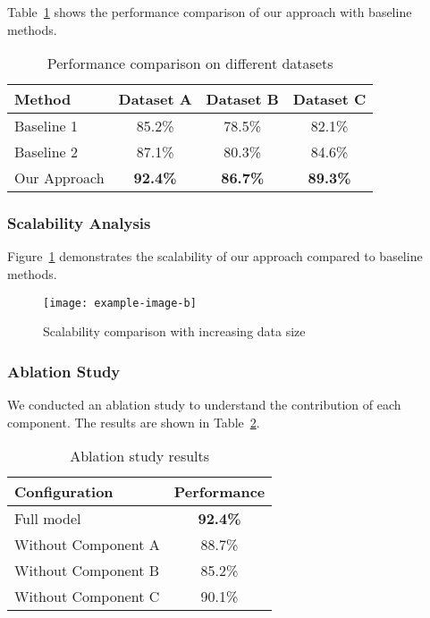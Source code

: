 Table~\ref{tab:paperone-performance} shows the performance comparison of our approach with baseline methods.

\begin{table}[!htb]
\centering
\caption{Performance comparison on different datasets}
\label{tab:paperone-performance}
\begin{tabular}{@{}lccc@{}}
\toprule
Method & Dataset A & Dataset B & Dataset C \\
\midrule
Baseline 1 & 85.2\% & 78.5\% & 82.1\% \\
Baseline 2 & 87.1\% & 80.3\% & 84.6\% \\
Our Approach & \textbf{92.4\%} & \textbf{86.7\%} & \textbf{89.3\%} \\
\bottomrule
\end{tabular}
\end{table}

\subsubsection{Scalability Analysis}

Figure~\ref{fig:paperone-scalability} demonstrates the scalability of our approach compared to baseline methods.

\begin{figure}[!htb]
    \centering
    \texttt{[image: example-image-b]}
    \caption{Scalability comparison with increasing data size}
    \label{fig:paperone-scalability}
\end{figure}

\lipsum[12-13]

\subsubsection{Ablation Study}

We conducted an ablation study to understand the contribution of each component. The results are shown in Table~\ref{tab:paperone-ablation}.

\begin{table}[!htb]
\centering
\caption{Ablation study results}
\label{tab:paperone-ablation}
\begin{tabular}{@{}lc@{}}
\toprule
Configuration & Performance \\
\midrule
Full model & \textbf{92.4\%} \\
Without Component A & 88.7\% \\
Without Component B & 85.2\% \\
Without Component C & 90.1\% \\
\bottomrule
\end{tabular}
\end{table}

